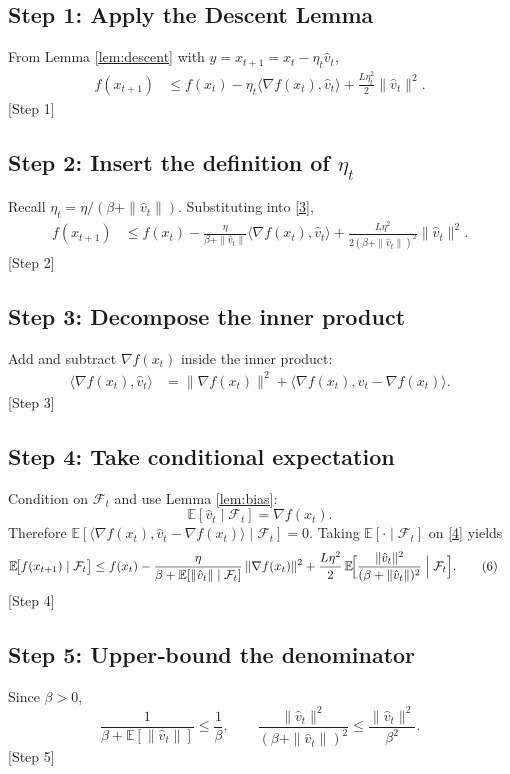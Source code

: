 \documentclass{article}
\newcommand{\E}{\mathbb{E}}
\begin{document}
\subsection*{Step 1: Apply the Descent Lemma}
From Lemma \ref{lem:descent} with $y=x_{t+1}=x_t-\eta_t\hat v_t$,
\begin{align}
f(x_{t+1})
&\le f(x_t)-\eta_t\langle\nabla f(x_t),\hat v_t\rangle+\frac{L\eta_t^{2}}{2}\|\hat v_t\|^{2}.
\tag{3}
\end{align}
[Step 1]

\subsection*{Step 2: Insert the definition of $\eta_t$}
Recall $\eta_t=\eta/(\beta+\|\hat v_t\|)$.  Substituting into \eqref{3},
\begin{align}
f(x_{t+1})
&\le f(x_t)-\frac{\eta}{\beta+\|\hat v_t\|}\langle\nabla f(x_t),\hat v_t\rangle
    +\frac{L\eta^{2}}{2(\beta+\|\hat v_t\|)^{2}}\|\hat v_t\|^{2}.
\tag{4}
\end{align}
[Step 2]

\subsection*{Step 3: Decompose the inner product}
Add and subtract $\nabla f(x_t)$ inside the inner product:
\begin{align}
\langle\nabla f(x_t),\hat v_t\rangle
&= \|\nabla f(x_t)\|^{2}
   +\langle\nabla f(x_t),\hat v_t-\nabla f(x_t)\rangle.
\tag{5}
\end{align}
[Step 3]

\subsection*{Step 4: Take conditional expectation}
Condition on $\mathcal{F}_t$ and use Lemma \ref{lem:bias}:
\[
\E[\hat v_t\mid\mathcal{F}_t]=\nabla f(x_t).
\]
Therefore $\E[\langle\nabla f(x_t),\hat v_t-\nabla f(x_t)\rangle\mid\mathcal{F}_t]=0$.
Taking $\E[\cdot\mid\mathcal{F}_t]$ on \eqref{4} yields
\begin{align}
\E\!\bigl[f(x_{t+1})\mid\mathcal{F}_t\bigr]
&\le f(x_t)-\frac{\eta}{\beta+\E[\|\hat v_t\|\mid\mathcal{F}_t]}\,\|\nabla f(x_t)\|^{2}
   +\frac{L\eta^{2}}{2}\,
     \E\!\Bigl[\frac{\|\hat v_t\|^{2}}{(\beta+\|\hat v_t\|)^{2}}\Bigm|\mathcal{F}_t\Bigr].
\tag{6}
\end{align}
[Step 4]

\subsection*{Step 5: Upper‑bound the denominator}
Since $\beta>0$,
\[
\frac{1}{\beta+\E[\|\hat v_t\|]}\le\frac{1}{\beta},
\qquad
\frac{\|\hat v_t\|^{2}}{(\beta+\|\hat v_t\|)^{2}}\le\frac{\|\hat v_t\|^{2}}{\beta^{2}}.
\tag{7}
\]
[Step 5]
\end{document}
